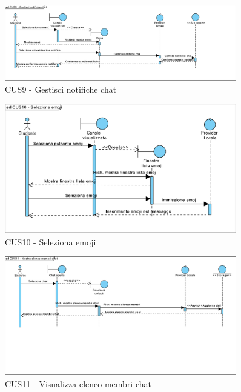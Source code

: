\begin{figure}
	\centering
	\includegraphics[width=0.9\textwidth]{imgs/gruppo6/sequence/CUS9_gestisci_notifiche_chat.pdf}
	\caption{CUS9 - Gestisci notifiche chat}
	\label{fig:seq-cus9}
\end{figure}

\begin{figure}
	\centering
	\includegraphics[width=0.9\textwidth]{imgs/gruppo6/sequence/CUS10_selezione_emoji.pdf}
	\caption{CUS10 - Seleziona emoji}
	\label{fig:seq-cus10}
\end{figure}

\begin{figure}
	\centering
	\includegraphics[width=0.9\textwidth]{imgs/gruppo6/sequence/CUS11_visualizza_elenco_membri_chat.pdf}
	\caption{CUS11 - Visualizza elenco membri chat}
	\label{fig:seq-cus11}
\end{figure}

